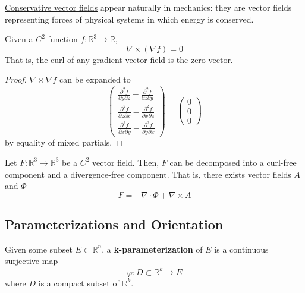   \hyperref[def:conservative-vector-fields]{Conservative vector fields} appear naturally in mechanics: they are vector fields representing forces of physical systems in which energy is conserved. 

	\begin{theorem}
	  \label{thm:gradient-fields-have-no-curl}
		Given a $C^2$-function $f: \mathbb{R}^3 \to \mathbb{R}$,
		\begin{equation}
			\nabla \times ( \nabla f) = 0
		\end{equation}
		That is, the curl of any gradient vector field is the zero vector. 
  \end{theorem}
  \begin{proof}
		$\nabla \times \nabla f$ can be expanded to
		\begin{equation} 
			\begin{pmatrix}
				\frac{\partial^2 f}{\partial y \partial z} - \frac{\partial^2 f}{\partial z \partial y} \\ 
				\frac{\partial^2 f}{\partial z \partial x} - \frac{\partial^2 f}{\partial x \partial z} \\
				\frac{\partial^2 f}{\partial x \partial y} - \frac{\partial^2 f}{\partial y \partial x}
			\end{pmatrix} = \begin{pmatrix}
			  0 \\ 0 \\ 0
			\end{pmatrix}
		\end{equation}
		by equality of mixed partials. 
  \end{proof}

  \begin{theorem}
    \label{thm:helmholtz-decomposition}
		Let $F: \mathbb{R}^3 \to \mathbb{R}^3$ be a $C^2$ vector field. Then, $F$ can be decomposed into a curl-free component and a divergence-free component. That is, there exists vector fields $A$ and $\Phi$
		\begin{equation}
			F = - \nabla \cdot \Phi + \nabla \times A
		\end{equation}
  \end{theorem}
		
\subsection{Parameterizations and Orientation}

	\begin{definition}[Parameterization]
	  \label{def:parameterization}
		Given some subset $E \subset \mathbb{R}^n$, a \textbf{k-parameterization} of $E$ is a continuous surjective map 
		\begin{equation}
		  \varphi: D \subset \mathbb{R}^k \to E
		\end{equation}
		where $D$ is a compact subset of $\mathbb{R}^k$. 
	\end{definition} 
	
